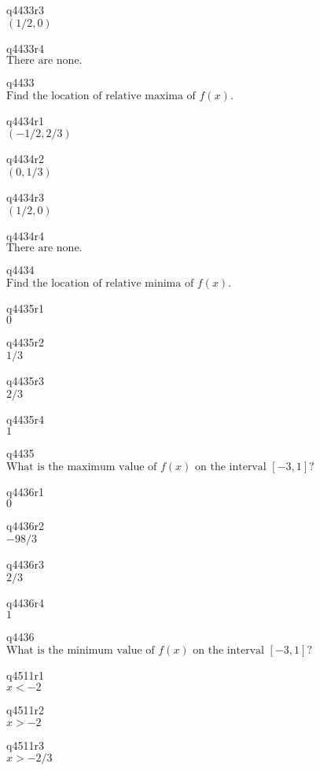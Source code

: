 q4433r3\\
\(\displaystyle (1/2, 0) \)

q4433r4\\
\(\displaystyle \text{There are none.} \)

q4433\\
\(\displaystyle \text{Find the location of relative maxima of } f(x). \)

q4434r1\\
\(\displaystyle (-1/2, 2/3) \)

q4434r2\\
\(\displaystyle (0, 1/3) \)

q4434r3\\
\(\displaystyle (1/2, 0) \)

q4434r4\\
\(\displaystyle \text{There are none.} \)

q4434\\
\(\displaystyle \text{Find the location of relative minima of } f(x). \)

q4435r1\\
\(\displaystyle 0 \)

q4435r2\\
\(\displaystyle 1/3 \)

q4435r3\\
\(\displaystyle 2/3 \)

q4435r4\\
\(\displaystyle 1 \)

q4435\\
\(\displaystyle \text{What is the maximum value of } f(x) \text{ on the interval } [-3, 1]? \)

q4436r1\\
\(\displaystyle 0 \)

q4436r2\\
\(\displaystyle -98/3 \)

q4436r3\\
\(\displaystyle 2/3 \)

q4436r4\\
\(\displaystyle 1 \)

q4436\\
\(\displaystyle \text{What is the minimum value of } f(x) \text{ on the interval } [-3, 1]? \)

q4511r1\\
\(\displaystyle x < -2 \)

q4511r2\\
\(\displaystyle x > -2 \)

q4511r3\\
\(\displaystyle x > -2/3 \)

